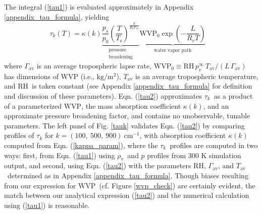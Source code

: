 \documentclass[10pt]{article}
\newcommand{\beqn}{\begin{equation}}
\newcommand{\eeqn}{\end{equation}}
\newcommand{\eqnref}[1]{(\ref{#1})}
\newcommand{\inverse}{^{-1}}
\newcommand{\der}[2]{\ensuremath{\frac{d #1}{d #2}}}
\newcommand{\cminverse}{\ensuremath{\mathrm{cm^{-1}}}}
\newcommand{\tauk}{\ensuremath{\tau_k}}
\newcommand{\rhov}{\ensuremath{\rho_\mathrm{v}}}
\newcommand{\Tav}{\ensuremath{T_\mathrm{av}}}
\newcommand{\Ts}{\ensuremath{T_\mathrm{s}}}
\newcommand{\ps}{\ensuremath{p_s}}
\newcommand{\RH}{\ensuremath{\mathrm{RH}}}
\newcommand{\WVP}{\ensuremath{\mathrm{WVP}}}
\newcommand{\Ttp}{\ensuremath{T_\mathrm{tp}}}
\newcommand{\gammaav}{\ensuremath{\Gamma_\mathrm{av}}}
\newcommand{\Kinverse}{\ensuremath{\mathrm{K^{-1}}}}
\begin{document}
The integral \eqnref{tau1} is evaluated approximately in Appendix \ref{appendix_tau_formula}, yielding 
	\beqn
		\tau_k(T) = \kappa(k) \underbrace{\frac{\ps}{p_0}\left(\frac{T}{\Ts}\right)^{\frac{g}{R_d\gammaav}}}_{\substack{\text{pressure} \\ \text{broadening}}} \underbrace{\WVP_0\exp\left(-\frac{L}{R_v T}\right)}_{\substack{\text{water vapor path}}} \quad 
	\label{tau2}
	\eeqn
where  $\gammaav$ is an average tropospheric lapse rate,  $\WVP_0 \equiv \RH\, p_v^\infty\, \Tav/(L\,\gammaav)$ has dimensions of WVP (i.e., $\mathrm{kg/m^2}$), $\Tav$ is an average tropospheric temperature, and \RH\ is taken constant (see Appendix \ref{appendix_tau_formula} for definition and discussion of these parameters).  Eqn. \eqnref{tau2} approximates \tauk\ as a product of a parameterized \WVP, the mass absorption coefficient $\kappa(k)$, and an approximate pressure broadening factor, and contains no unobservable, tunable parameters. The left panel of Fig. \ref{tauk} validates Eqn. \eqnref{tau2} by comparing profiles of $\tau_k$ for  $k=(100,\ 500,\ 900)\ \cminverse$, with absorption coefficient $\kappa(k)$ computed from Eqn. \eqnref{kappa_param}, where the \tauk\ profiles are computed in two ways: first,  from  Eqn. \eqnref{tau1} using \rhov\ and $p$ profiles from 300 K simulation output, and second, using Eqn. \eqnref{tau2} with the parameters \RH, \gammaav, and \Tav\ determined as  in Appendix \ref{appendix_tau_formula}.  Though biases resulting from our expression for  \WVP\ (cf. Figure \ref{wvp_check}) are certainly evident, the match between our analytical expression \eqnref{tau2} and the numerical calculation using \eqnref{tau1} is reasonable.




\end{document}
